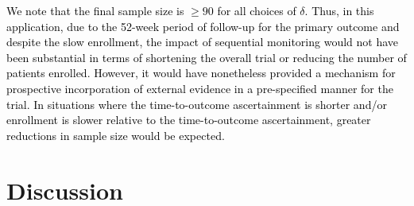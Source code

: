 \documentclass[12pt]{article}
\begin{document}
\textcolor{black}{We note that the final sample size is $\ge 90$ for all choices of $\delta$. Thus, in this application, due to the 52-week period of follow-up for the primary outcome and despite the slow enrollment, the impact of sequential monitoring would not have been substantial in terms of shortening the overall trial or reducing the number of patients enrolled. However, it would have nonetheless provided a mechanism for prospective incorporation of external evidence in a pre-specified manner for the trial. In situations where the time-to-outcome ascertainment is shorter and/or enrollment is slower relative to the time-to-outcome ascertainment, greater reductions in sample size would be expected.}
\section{Discussion}\label{sec:discussion}
%
%
%
%
%
%
\end{document}
